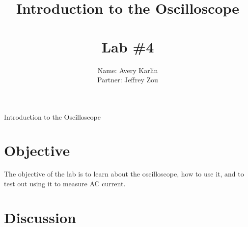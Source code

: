\documentclass[11pt, titlepage]{article}
\title{Introduction to the Oscilloscope \\ \ \\ \large Lab \#4}
\author{Name: Avery Karlin \\ Partner: Jeffrey Zou}
\date{}
\begin{document}
\maketitle

\begin{center}
\LARGE Introduction to the Oscilloscope
\end{center}

\section*{Objective}
The objective of the lab is to learn about the oscilloscope, how to use it, and to test out using it to measure AC current.

\section*{Discussion}
\end{document}
